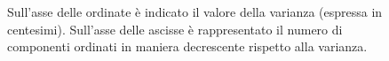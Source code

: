 \documentclass[12pt,italian]{report}
\begin{document}
\begin{figure}
	\centering
	\caption{ Sull'asse delle ordinate è indicato il valore della varianza (espressa in centesimi). Sull'asse delle ascisse è rappresentato il numero di componenti ordinati in maniera decrescente rispetto alla varianza.}
	\label{fig:var_ratio_pca}
\end{figure}
\end{document}
